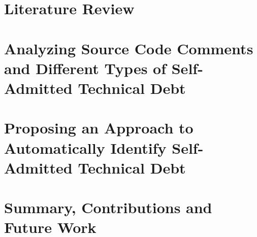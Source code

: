 \documentclass[12pt]{report}
\begin{document}
\chapter{Literature Review}
\label{literature_review}


\chapter{Analyzing Source Code Comments and Different Types of Self-Admitted Technical Debt}
\label{chapter3}


\chapter{Proposing an Approach to Automatically Identify Self-Admitted Technical Debt}
\label{chapter4}


\chapter{Summary, Contributions and Future Work}
\label{conclusion}



  

\end{document}
